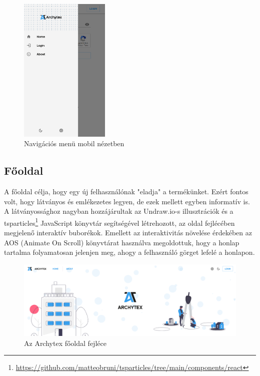 \begin{figure}[H]
  \centering
  \includegraphics[height=7cm]{parts/developer-documentation/frontend/images/mobile-view.png}
  \caption{Navigációs menü mobil nézetben}
\end{figure}

\subsection{Főoldal}
A főoldal célja, hogy egy új felhasználónak "eladja" a termékünket. Ezért fontos volt, hogy látványos és emlékezetes legyen, de ezek mellett egyben informatív is. A látványossághoz nagyban hozzájárultak az Undraw.io-s illusztrációk és a tsparticles\footnote{\url{https://github.com/matteobruni/tsparticles/tree/main/components/react}} JavaScript könyvtár segítségével létrehozott, az oldal fejlécében megjelenő interaktív buborékok. Emellett az interaktivitás növelése érdekében az AOS (Animate On Scroll) könyvtárat használva megoldottuk, hogy a honlap tartalma folyamatosan jelenjen meg, ahogy a felhasználó görget lefelé a honlapon.

\begin{figure}[H]
  \centering
  \includegraphics[width=\textwidth]{parts/developer-documentation/frontend/images/header.png}
  \caption{Az Archytex főoldal fejléce}
\end{figure}

